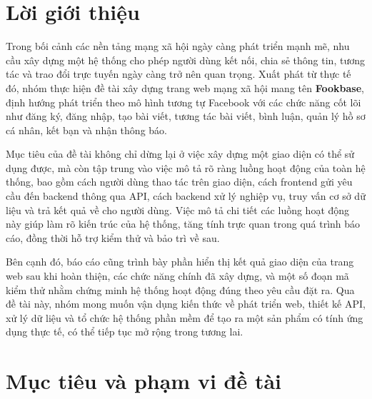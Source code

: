 \documentclass[a4paper,12pt]{article}
\begin{document}
\tableofcontents
\newpage

\section{Lời giới thiệu}

Trong bối cảnh các nền tảng mạng xã hội ngày càng phát triển mạnh mẽ, nhu cầu xây dựng một hệ thống cho phép người dùng kết nối, chia sẻ thông tin, tương tác và trao đổi trực tuyến ngày càng trở nên quan trọng. Xuất phát từ thực tế đó, nhóm thực hiện đề tài xây dựng trang web mạng xã hội mang tên \textbf{Fookbase}, định hướng phát triển theo mô hình tương tự Facebook với các chức năng cốt lõi như đăng ký, đăng nhập, tạo bài viết, tương tác bài viết, bình luận, quản lý hồ sơ cá nhân, kết bạn và nhận thông báo.

Mục tiêu của đề tài không chỉ dừng lại ở việc xây dựng một giao diện có thể sử dụng được, mà còn tập trung vào việc mô tả rõ ràng luồng hoạt động của toàn hệ thống, bao gồm cách người dùng thao tác trên giao diện, cách frontend gửi yêu cầu đến backend thông qua API, cách backend xử lý nghiệp vụ, truy vấn cơ sở dữ liệu và trả kết quả về cho người dùng. Việc mô tả chi tiết các luồng hoạt động này giúp làm rõ kiến trúc của hệ thống, tăng tính trực quan trong quá trình báo cáo, đồng thời hỗ trợ kiểm thử và bảo trì về sau.

Bên cạnh đó, báo cáo cũng trình bày phần hiển thị kết quả giao diện của trang web sau khi hoàn thiện, các chức năng chính đã xây dựng, và một số đoạn mã kiểm thử nhằm chứng minh hệ thống hoạt động đúng theo yêu cầu đặt ra. Qua đề tài này, nhóm mong muốn vận dụng kiến thức về phát triển web, thiết kế API, xử lý dữ liệu và tổ chức hệ thống phần mềm để tạo ra một sản phẩm có tính ứng dụng thực tế, có thể tiếp tục mở rộng trong tương lai.

\section{Mục tiêu và phạm vi đề tài}
\end{document}
